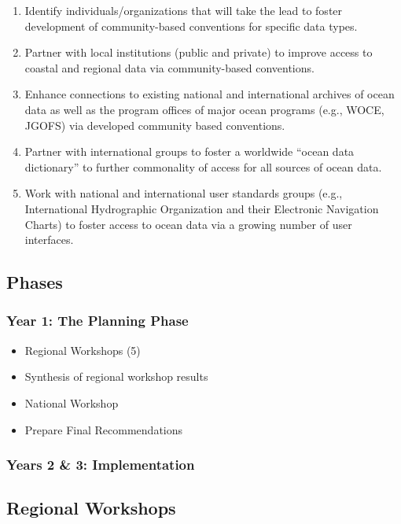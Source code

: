 \begin{enumerate}
\item Identify individuals/organizations that will take the lead to foster development of 
community-based conventions for specific data types.
\item Partner with local institutions (public and private) to improve access to coastal and regional 
data via community-based conventions.
\item Enhance connections to existing national and international archives of ocean data as well as 
the program offices of major ocean programs (e.g., WOCE, JGOFS) via developed 
community based conventions.
\item Partner with international groups to foster a worldwide ``ocean data dictionary'' to further 
commonality of access for all sources of ocean data.
\item Work with national and international user standards groups (e.g., International Hydrographic 
Organization and their Electronic Navigation Charts) to foster access to ocean data via a 
growing number of user interfaces.
\end{enumerate}

\subsection{Phases}

\subsubsection{Year 1: The Planning Phase}

\begin{itemize}
\item     Regional Workshops (5)

\item     Synthesis of regional workshop results

\item     National Workshop

\item     Prepare Final Recommendations
\end{itemize}

\subsubsection{Years 2 \& 3: Implementation}

\subsection{Regional Workshops}

